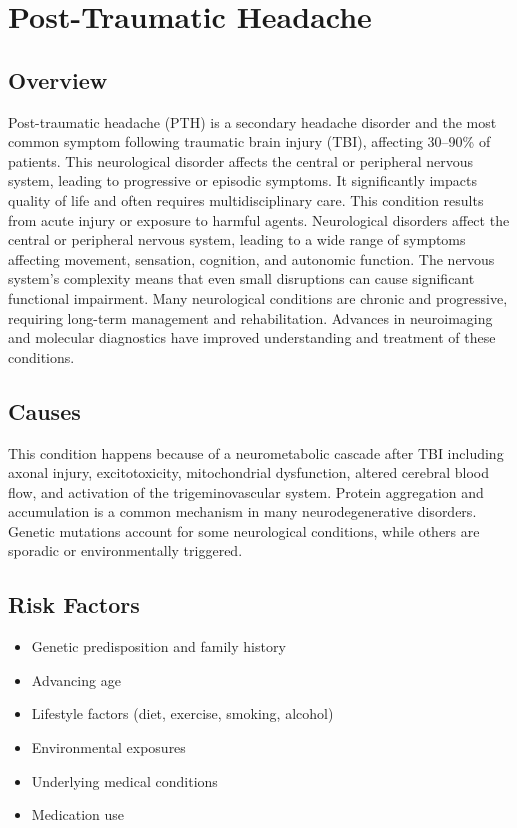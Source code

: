 \chapter{Post-Traumatic Headache}
\label{sec:Post-Traumatic Headache}

\section{Overview}
Post-traumatic headache (PTH) is a secondary headache disorder and the most common symptom following traumatic brain injury (TBI), affecting 30--90\% of patients. This neurological disorder affects the central or peripheral nervous system, leading to progressive or episodic symptoms. It significantly impacts quality of life and often requires multidisciplinary care. This condition results from acute injury or exposure to harmful agents. Neurological disorders affect the central or peripheral nervous system, leading to a wide range of symptoms affecting movement, sensation, cognition, and autonomic function. The nervous system's complexity means that even small disruptions can cause significant functional impairment. Many neurological conditions are chronic and progressive, requiring long-term management and rehabilitation. Advances in neuroimaging and molecular diagnostics have improved understanding and treatment of these conditions.
\section{Causes}
This condition happens because of a neurometabolic cascade after TBI including axonal injury, excitotoxicity, mitochondrial dysfunction, altered cerebral blood flow, and activation of the trigeminovascular system.    Protein aggregation and accumulation is a common mechanism in many neurodegenerative disorders.  Genetic mutations account for some neurological conditions, while others are sporadic or environmentally triggered.   
\section{Risk Factors}
\begin{itemize}[noitemsep]
  \item Genetic predisposition and family history
  \item Advancing age
  \item Lifestyle factors (diet, exercise, smoking, alcohol)
  \item Environmental exposures
  \item Underlying medical conditions
  \item Medication use
\end{itemize}
